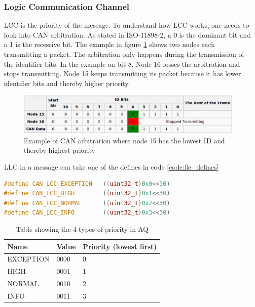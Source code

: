 \subsubsection{Logic Communication Channel}
LCC is the priority of the message. 
To understand how LCC works, one needs to look into CAN arbitration.
As stated in ISO-11898-2, a 0 is the dominant bit and a 1 is the recessive bit.
The example in figure \ref{tab:can_arbitration} shows two nodes each transmitting a packet.
The arbitration only happens during the transmission of the identifier bits.
In the example on bit 8, Node 16 losses the arbitration and stops transmitting.
Node 15 keeps transmitting its packet because it has lower identifier bits and thereby higher priority.
\begin{figure}[H]
    \center
    \includegraphics[width=1\textwidth]{graphics/can_arbitration.eps}
    \caption{Example of CAN arbitration where node 15 has the lowest ID and thereby highest priority}
    \label{tab:can_arbitration}
\end{figure}
\newpage
LLC in a message can take one of the defines in code \ref{code:llc_defines}
\begin{lstlisting}[language = c, caption = LLC defines, label=code:llc_defines]
#define CAN_LCC_EXCEPTION   ((uint32_t)0x0<<30)
#define CAN_LCC_HIGH        ((uint32_t)0x1<<30)
#define CAN_LCC_NORMAL      ((uint32_t)0x2<<30)
#define CAN_LCC_INFO        ((uint32_t)0x3<<30)
\end{lstlisting}

\begin{table}[H]
\centering
\caption{Table showing the 4 types of priority in AQ}
\label{my-label}
\begin{tabular}{|l|l|l|}
\hline
\textbf{Name} & \textbf{Value} & \textbf{Priority (lowest first)} \\ \hline
EXCEPTION     & 0000           & 0                 \\ \hline
HIGH          & 0001           & 1                 \\ \hline
NORMAL        & 0010           & 2                 \\ \hline
INFO          & 0011           & 3                 \\ \hline
\end{tabular}
\end{table}

